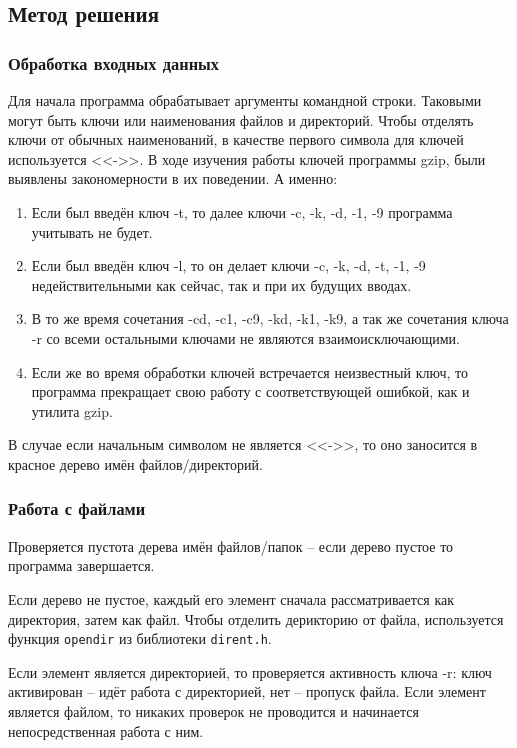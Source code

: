 \documentclass[12pt]{article}
\begin{document}
\subsection*{Метод решения}

\subsubsection*{Обработка входных данных}

Для начала программа обрабатывает аргументы командной строки. Таковыми могут быть ключи или наименования файлов и директорий. Чтобы отделять ключи от обычных наименований, в качестве первого символа для ключей используется <<->>. В ходе изучения работы ключей программы gzip, были выявлены закономерности в их поведении. А именно:

\begin{enumerate}
    \item Если был введён ключ -t, то далее ключи -c, -k, -d, -1, -9 программа учитывать не будет.
    \item Если был введён ключ -l, то он делает ключи -c, -k, -d, -t, -1, -9 недействительными как сейчас, так и при их будущих вводах.
    \item В то же время сочетания -cd, -c1, -c9, -kd, -k1, -k9, а так же сочетания ключа -r со всеми остальными ключами не являются взаимоисключающими.
    \item Если же во время обработки ключей встречается неизвестный ключ, то программа прекращает свою работу с соответствующей ошибкой, как и утилита gzip.
\end{enumerate}

В случае если начальным символом не является <<->>, то оно заносится в красное дерево имён файлов/директорий. 

\subsubsection*{Работа с файлами}

Проверяется пустота дерева имён файлов/папок -- если дерево пустое то программа завершается. 

Если дерево не пустое, каждый его элемент сначала рассматривается как директория, затем как файл. Чтобы отделить дерикторию от файла, используется функция \texttt{opendir} из библиотеки \texttt{dirent.h}.

Если элемент является директорией, то проверяется активность ключа -r: ключ активирован -- идёт работа с директорией, нет -- пропуск файла. Если элемент является файлом, то никаких проверок не проводится и начинается непосредственная работа с ним.
\end{document}
